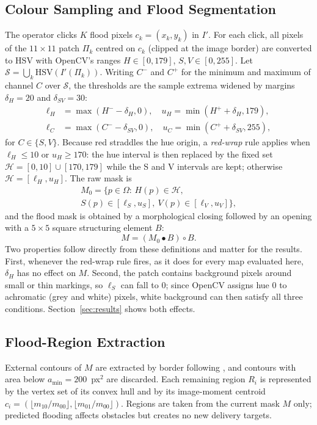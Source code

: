 \subsection{Colour Sampling and Flood Segmentation}
The operator clicks $K$ flood pixels $c_k=(x_k,y_k)$ in $I'$. For each click, all pixels of the $11\times11$ patch $\Pi_k$ centred on $c_k$ (clipped at the image border) are converted to HSV \cite{smith1978color} with OpenCV's ranges $H\in[0,179]$, $S,V\in[0,255]$. Let $\mathcal{S}=\bigcup_k\mathrm{HSV}(I'(\Pi_k))$. Writing $C^{-}$ and $C^{+}$ for the minimum and maximum of channel $C$ over $\mathcal{S}$, the thresholds are the sample extrema widened by margins $\delta_H=20$ and $\delta_{SV}=30$:
\begin{align}
\ell_H&=\max(H^{-}-\delta_H,0),\quad u_H=\min(H^{+}+\delta_H,179),\label{eq:hsvH}\\
\ell_C&=\max(C^{-}-\delta_{SV},0),\quad u_C=\min(C^{+}+\delta_{SV},255),\label{eq:hsvSV}
\end{align}
for $C\in\{S,V\}$. Because red straddles the hue origin, a \emph{red-wrap} rule applies when $\ell_H\le10$ or $u_H\ge170$: the hue interval is then replaced by the fixed set $\mathcal{H}=[0,10]\cup[170,179]$ while the S and V intervals are kept; otherwise $\mathcal{H}=[\ell_H,u_H]$. The raw mask is
\begin{multline}
M_0=\{p\in\Omega:\,H(p)\in\mathcal{H},\\ S(p)\in[\ell_S,u_S],\ V(p)\in[\ell_V,u_V]\},
\end{multline}
and the flood mask is obtained by a morphological closing followed by an opening \cite{haralick1987image} with a $5\times5$ square structuring element $B$:
\begin{equation}
M=(M_0\bullet B)\circ B .
\label{eq:morph}
\end{equation}
Two properties follow directly from these definitions and matter for the results. First, whenever the red-wrap rule fires, as it does for every map evaluated here, $\delta_H$ has no effect on $M$. Second, the patch contains background pixels around small or thin markings, so $\ell_S$ can fall to $0$; since OpenCV assigns hue $0$ to achromatic (grey and white) pixels, white background can then satisfy all three conditions. Section~\ref{sec:results} shows both effects.

\subsection{Flood-Region Extraction}
External contours of $M$ are extracted by border following \cite{suzuki1985topological}, and contours with area below $a_{\min}=200$~px$^2$ are discarded. Each remaining region $R_i$ is represented by the vertex set of its convex hull and by its image-moment centroid $c_i=(\lfloor m_{10}/m_{00}\rfloor,\lfloor m_{01}/m_{00}\rfloor)$. Regions are taken from the current mask $M$ only; predicted flooding affects obstacles but creates no new delivery targets.

